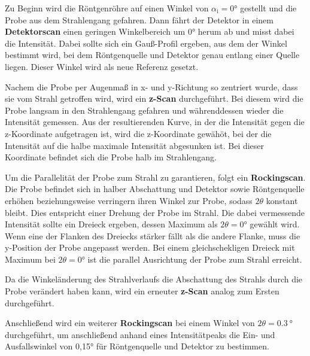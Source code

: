         \FloatBarrier
  

        Zu Beginn wird die Röntgenröhre auf einen Winkel von $\alpha_{\text{i}} = 0°$ gestellt und die Probe aus dem Strahlengang gefahren. Dann fährt der Detektor in einem \textbf{Detektorscan} einen geringen 
        Winkelbereich um 0° herum ab und misst dabei die Intensität. Dabei sollte sich ein Gauß-Profil ergeben, aus dem der Winkel bestimmt wird, bei dem Röntgenquelle und Detektor genau entlang einer Quelle 
        liegen. Dieser Winkel wird als neue Referenz gesetzt.\newline
        
        Nachem die Probe per Augenmaß in x- und y-Richtung so zentriert wurde, dass sie vom Strahl getroffen wird, wird ein \textbf{z-Scan} durchgeführt. Bei diesem wird die Probe langsam in den Strahlengang 
        gefahren und währenddessen wieder die Intensität gemessen. Aus der resultierenden Kurve, in der die Intensität gegen die z-Koordinate aufgetragen ist, wird die z-Koordinate gewähöt, bei der die Intensität
        auf die halbe maximale Intensität abgesunken ist. Bei dieser Koordinate befindet sich die Probe halb im Strahlengang.\newline
        
        Um die Parallelität der Probe zum Strahl zu garantieren, folgt ein \textbf{Rockingscan}. Die Probe befindet sich in halber Abschattung und Detektor sowie Röntgenquelle erhöhen beziehungsweise verringern 
        ihren Winkel zur Probe, sodass $2\theta$ konstant bleibt. Dies entspricht einer Drehung der Probe im Strahl. Die dabei vermessende Intensität sollte ein Dreieck ergeben, dessen Maximum als $2\theta=0°$
        gewählt wird. Wenn eine der Flanken des Dreiecks stärker fällt als die andere Flanke, muss die y-Position der Probe angepasst werden. Bei einem gleichschekligen Dreieck mit Maximum bei $2\theta=0°$ ist
        die parallel Ausrichtung der Probe zum Strahl erreicht.\newline

        Da die Winkeländerung des Strahlverlaufs die Abschattung des Strahls durch die Probe verändert haben kann, wird ein erneuter \textbf{z-Scan} analog zum Ersten durchgeführt. 

        Anschließend wird ein weiterer \textbf{Rockingscan} bei einem Winkel von $2\theta = \SI{0.3}{\degree}$ durchgeführt, um anschließend anhand eines Intensitätpeaks die Ein- und Ausfallswinkel von 0,15°
        für Röntgenquelle und Detektor zu bestimmen. 

